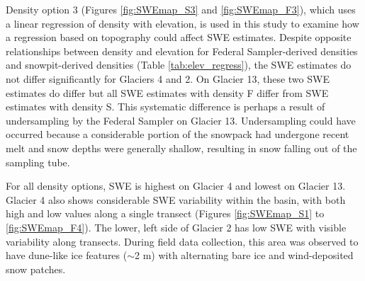 \documentclass{sfuthesis}
\begin{document}
Density option 3 (Figures \ref{fig:SWEmap_S3} and \ref{fig:SWEmap_F3}), which uses a linear regression of density with elevation, is used in this study to examine how a regression based on topography could affect SWE estimates. Despite opposite relationships between density and elevation for Federal Sampler-derived densities and snowpit-derived densities (Table \ref{tab:elev_regress}), the SWE estimates do not differ significantly for Glaciers 4 and 2. On Glacier 13, these two SWE estimates do differ but all SWE estimates with density F differ from SWE estimates with density S. This systematic difference is perhaps a result of undersampling by the Federal Sampler on Glacier 13. Undersampling could have occurred because a considerable portion of the snowpack had undergone recent melt and snow depths were generally shallow, resulting in snow falling out of the sampling tube. 

For all density options, SWE is highest on Glacier 4 and lowest on Glacier 13. Glacier 4 also shows considerable SWE variability within the basin, with both high and low values along a single transect (Figures \ref{fig:SWEmap_S1} to \ref{fig:SWEmap_F4}). The lower, left side of Glacier 2 has low SWE with visible variability along transects. During field data collection, this area was observed to have dune-like ice features ($\sim$2 m) with alternating bare ice and wind-deposited snow patches.
\end{document}
